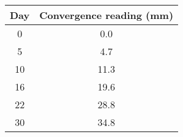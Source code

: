 \begin{center}
  \label{tab:q39-conv}
  \begin{tabular}{|c|c|}
    \hline
    \textbf{Day} & \textbf{Convergence reading (mm)} \\ \hline
     0 &  0.0  \\ \hline
     5 &  4.7  \\ \hline
    10 & 11.3  \\ \hline
    16 & 19.6  \\ \hline
    22 & 28.8  \\ \hline
    30 & 34.8  \\ \hline
  \end{tabular}
\end{center}
